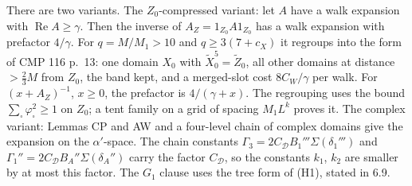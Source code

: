 There are two variants. The $Z_0$-compressed variant: let $A$ have a walk expansion with $\operatorname{Re}A\ge\gamma$. Then the inverse of $A_Z=1_{Z_0}A1_{Z_0}$ has a walk expansion with prefactor $4/\gamma$. For $q=M/M_1>10$ and $q\ge3(7+c_X)$ it regroups into the form of CMP 116 p.~13: one domain $X_0$ with $\tilde X_0^5=\tilde Z_0$, all other domains at distance $>\tfrac23M$ from $Z_0$, the band kept, and a merged-slot cost $8C_W/\gamma$ per walk. For $(x+A_Z)^{-1}$, $x\ge0$, the prefactor is $4/(\gamma+x)$. The regrouping uses the bound $\sum_\square\varphi_\square^2\ge1$ on $Z_0$; a tent family on a grid of spacing $M_1L^k$ proves it. The complex variant: Lemmas CP and AW and a four-level chain of complex domains give the expansion on the $\alpha'$-space. The chain constants $\Gamma_3=2C_{\mathcal D}B_1'''\Sigma(\delta_1''')$ and $\Gamma_1''=2C_{\mathcal D}B_A''\Sigma(\delta_A'')$ carry the factor $C_{\mathcal D}$, so the constants $k_1$, $k_2$ are smaller by at most this factor. The $G_1$ clause uses the tree form of (H1), stated in  6.9.


